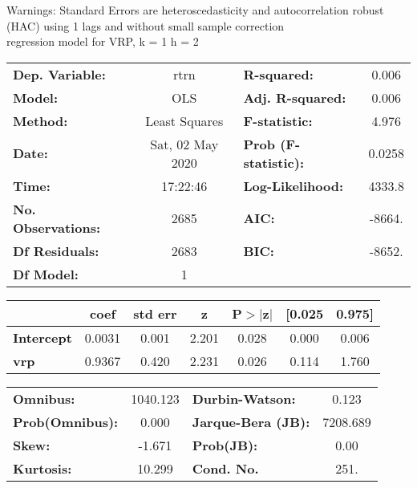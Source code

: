 Warnings: \newline
 [1] Standard Errors are heteroscedasticity and autocorrelation robust (HAC) using 1 lags and without small sample correction\\ 

regression model for VRP, k = 1 h = 2\begin{center}
\begin{tabular}{lclc}
\toprule
\textbf{Dep. Variable:}    &       rtrn       & \textbf{  R-squared:         } &     0.006   \\
\textbf{Model:}            &       OLS        & \textbf{  Adj. R-squared:    } &     0.006   \\
\textbf{Method:}           &  Least Squares   & \textbf{  F-statistic:       } &     4.976   \\
\textbf{Date:}             & Sat, 02 May 2020 & \textbf{  Prob (F-statistic):} &   0.0258    \\
\textbf{Time:}             &     17:22:46     & \textbf{  Log-Likelihood:    } &    4333.8   \\
\textbf{No. Observations:} &        2685      & \textbf{  AIC:               } &    -8664.   \\
\textbf{Df Residuals:}     &        2683      & \textbf{  BIC:               } &    -8652.   \\
\textbf{Df Model:}         &           1      & \textbf{                     } &             \\
\bottomrule
\end{tabular}
\begin{tabular}{lcccccc}
                   & \textbf{coef} & \textbf{std err} & \textbf{z} & \textbf{P$> |$z$|$} & \textbf{[0.025} & \textbf{0.975]}  \\
\midrule
\textbf{Intercept} &       0.0031  &        0.001     &     2.201  &         0.028        &        0.000    &        0.006     \\
\textbf{vrp}       &       0.9367  &        0.420     &     2.231  &         0.026        &        0.114    &        1.760     \\
\bottomrule
\end{tabular}
\begin{tabular}{lclc}
\textbf{Omnibus:}       & 1040.123 & \textbf{  Durbin-Watson:     } &    0.123  \\
\textbf{Prob(Omnibus):} &   0.000  & \textbf{  Jarque-Bera (JB):  } & 7208.689  \\
\textbf{Skew:}          &  -1.671  & \textbf{  Prob(JB):          } &     0.00  \\
\textbf{Kurtosis:}      &  10.299  & \textbf{  Cond. No.          } &     251.  \\
\bottomrule
\end{tabular}
\end{center}

